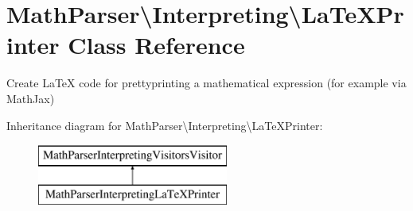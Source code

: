 \hypertarget{classMathParser_1_1Interpreting_1_1LaTeXPrinter}{\section{Math\-Parser\textbackslash{}Interpreting\textbackslash{}La\-Te\-X\-Printer Class Reference}
\label{classMathParser_1_1Interpreting_1_1LaTeXPrinter}
}


Create La\-Te\-X code for prettyprinting a mathematical expression (for example via Math\-Jax)  


Inheritance diagram for Math\-Parser\textbackslash{}Interpreting\textbackslash{}La\-Te\-X\-Printer\-:\begin{figure}[H]
\begin{center}
\leavevmode
\includegraphics[height=2.000000cm]{classMathParser_1_1Interpreting_1_1LaTeXPrinter}
\end{center}
\end{figure}

